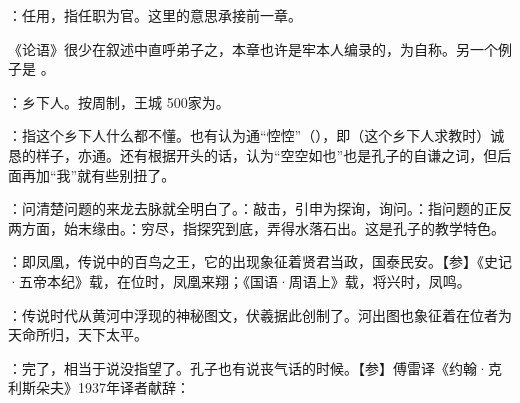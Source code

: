 {
\begin{lyitemize}
\item {}：任用，指任职为官。这里的意思承接前一章。
\end{lyitemize}
《论语》很少在叙述中直呼弟子之，本章也许是牢本人编录的，为自称。另一个例子是  。
}
{}


{
\item {}：乡下人。按周制，王城 500家为。
\item {}：指这个乡下人什么都不懂。也有认为通“悾悾”（），即（这个乡下人求教时）诚恳的样子，亦通。还有根据开头的话，认为“空空如也”也是孔子的自谦之词，但后面再加“我”就有些别扭了。
\item {}：问清楚问题的来龙去脉就全明白了。：敲击，引申为探询，询问。：指问题的正反两方面，始末缘由。：穷尽，指探究到底，弄得水落石出。这是孔子的教学特色。
}
{}


{
\item {}：即凤凰，传说中的百鸟之王，它的出现象征着贤君当政，国泰民安。【参】《史记·五帝本纪》载，在位时，凤凰来翔；《国语·周语上》载，将兴时，凤鸣。
\item {}：传说时代从黄河中浮现的神秘图文，伏羲据此创制了。河出图也象征着在位者为天命所归，天下太平。
\item {}：完了，相当于说没指望了。孔子也有说丧气话的时候。【参】傅雷译《约翰·克利斯朵夫》1937年译者献辞： %
}
{}


